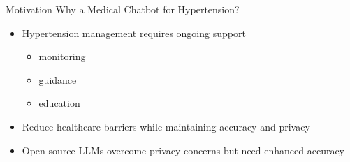 \documentclass[handout]{beamer}\mode<handout>{\usetheme{AMSBolognaFC}}
\begin{document}
\begin{frame}[c]{Motivation}
    Why a Medical Chatbot for Hypertension?
    \vfill
    \begin{itemize}
        \item Hypertension management requires ongoing support
        \begin{itemize}
            \item \alert{monitoring}
            \item \alert{guidance}
            \item education
        \end{itemize}
        \item Reduce healthcare barriers while maintaining \alert{accuracy} and \alert{privacy}
        \item Open-source LLMs overcome privacy concerns but need enhanced accuracy
    \end{itemize}
    \vfill
\end{frame}
\end{document}
